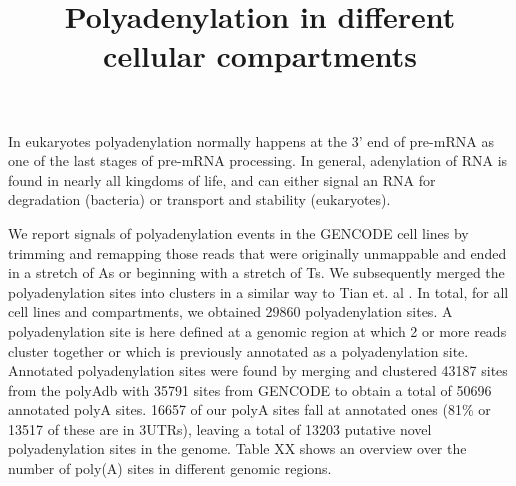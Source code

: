 \documentclass[a4paper]{article}
\title{Polyadenylation in different cellular compartments}
\begin{document}
 

\maketitle

In eukaryotes polyadenylation normally happens at the 3' end of pre-mRNA as one
of the last stages of pre-mRNA processing. In general, adenylation of RNA is
found in nearly all kingdoms of life, and can either signal an RNA for
degradation (bacteria) or transport and stability (eukaryotes).

We report signals of polyadenylation events in the GENCODE cell lines by
trimming and remapping those reads that were originally unmappable and ended in
a stretch of As or beginning with a stretch of Ts. We subsequently merged the
polyadenylation sites into clusters in a similar way to Tian et. al
\cite{tian_large-scale_2005}. In total, for all cell lines and compartments, we
obtained 29860 polyadenylation sites. A polyadenylation site is here defined at
a genomic region at which 2 or more reads cluster together or which is
previously annotated as a polyadenylation site. Annotated polyadenylation sites
were found by merging and clustered 43187 sites from the polyAdb with 35791
sites from GENCODE to obtain a total of 50696 annotated polyA sites. 16657 of
our polyA sites fall at annotated ones (81\% or 13517 of these are in 3UTRs),
leaving a total of 13203 putative novel polyadenylation sites in the genome.
Table XX shows an overview over the number of poly(A) sites in different
genomic regions.
\end{document}
